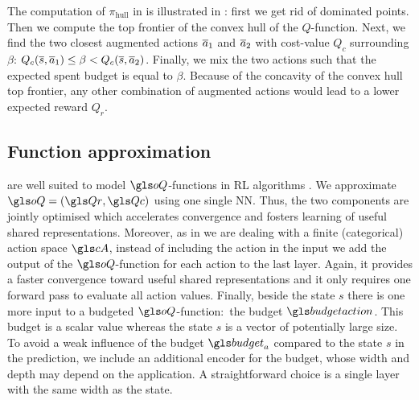 The computation of $\pi_\text{hull}$ in  is illustrated in : first we get rid of dominated points. Then we compute the top frontier of the convex hull of the $Q$-function. Next, we find the two closest augmented actions $\overline{a}_1$ and $\overline{a}_2$ with cost-value $Q_c$ surrounding $\beta$:  $Q_c(\overline{s},\overline{a}_1)\leq\beta<Q_c(\overline{s},\overline{a}_2)$. Finally, we mix the two actions such that the expected spent budget is equal to $\beta$. Because of the concavity of the convex hull top frontier, any other combination of augmented actions would lead to a lower expected reward $Q_r$. 




\subsection{Function approximation}

 are well suited to model $\oQ$-functions in \gls{RL} algorithms \citep{Mnih2015}. We approximate $\oQ = (\Qr, \Qc)$ using one single \gls{NN}. Thus, the two components are jointly optimised which accelerates convergence and fosters learning of useful shared representations. Moreover, as in \citep{Mnih2015} we are dealing with a finite (categorical) action space $\cA$, instead of including the action in the input we add the output of the $\oQ$-function for each action to the last layer. Again, it provides a faster convergence toward useful shared representations and it only requires one forward pass to evaluate all action values. Finally, beside the state $s$ there is one more input to a budgeted $\oQ$-function:~the budget $\budgetaction$. This budget is a scalar value whereas the state $s$ is a vector of potentially large size. To avoid a weak influence of the budget $\budget_a$ compared to the state $s$ in the prediction, we include an additional encoder for the budget, whose width and depth may depend on the application. A straightforward choice is a single layer with the same width as the state.

